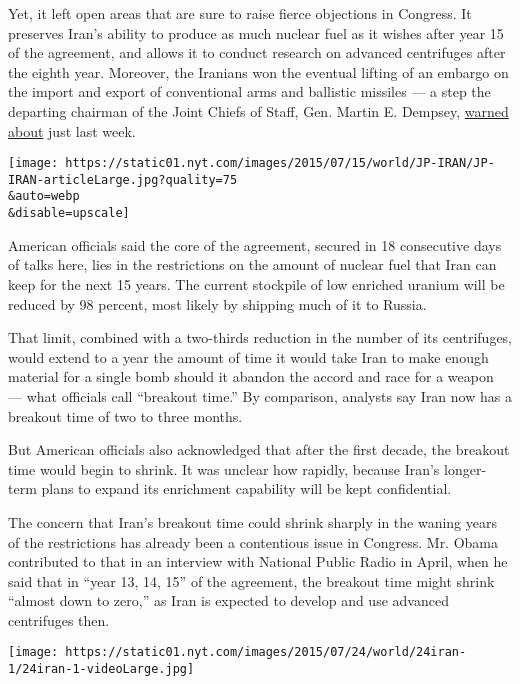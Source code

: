 Yet, it left open areas that are sure to raise fierce objections in
Congress. It preserves Iran's ability to produce as much nuclear fuel as
it wishes after year 15 of the agreement, and allows it to conduct
research on advanced centrifuges after the eighth year. Moreover, the
Iranians won the eventual lifting of an embargo on the import and export
of conventional arms and ballistic missiles --- a step the departing
chairman of the Joint Chiefs of Staff, Gen. Martin E. Dempsey,
\href{http://www.nytimes.com/2015/07/11/world/middleeast/un-arms-ban-on-iran-remains-a-hurdle-to-nuclear-deal.html}{warned
about} just last week.

\texttt{[image: https://static01.nyt.com/images/2015/07/15/world/JP-IRAN/JP-IRAN-articleLarge.jpg?quality=75\\\&auto=webp\\\&disable=upscale]}

American officials said the core of the agreement, secured in 18
consecutive days of talks here, lies in the restrictions on the amount
of nuclear fuel that Iran can keep for the next 15 years. The current
stockpile of low enriched uranium will be reduced by 98 percent, most
likely by shipping much of it to Russia.

That limit, combined with a two-thirds reduction in the number of its
centrifuges, would extend to a year the amount of time it would take
Iran to make enough material for a single bomb should it abandon the
accord and race for a weapon --- what officials call ``breakout time.''
By comparison, analysts say Iran now has a breakout time of two to three
months.

But American officials also acknowledged that after the first decade,
the breakout time would begin to shrink. It was unclear how rapidly,
because Iran's longer-term plans to expand its enrichment capability
will be kept confidential.

The concern that Iran's breakout time could shrink sharply in the waning
years of the restrictions has already been a contentious issue in
Congress. Mr. Obama contributed to that in an interview with National
Public Radio in April, when he said that in ``year 13, 14, 15'' of the
agreement, the breakout time might shrink ``almost down to zero,'' as
Iran is expected to develop and use advanced centrifuges then.

\href{https://www.nytimes.com/interactive/2015/07/14/world/middleeast/iran-nuclear-deal-who-got-what-they-wanted.html}{}

\texttt{[image: https://static01.nyt.com/images/2015/07/24/world/24iran-1/24iran-1-videoLarge.jpg]}

